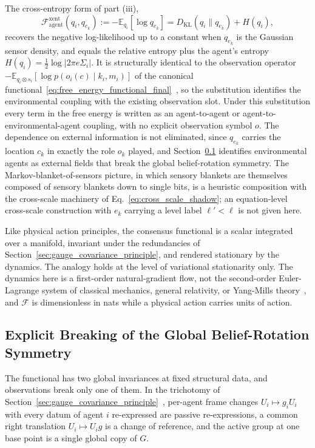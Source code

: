 The cross-entropy form of part (iii),
\begin{equation}
\mathcal{F}_{\text{agent}}^{\mathrm{xent}}(q_i, q_{e_k}) := -\mathbb{E}_{q_i}[\log q_{e_k}] = D_{\mathrm{KL}}(q_i \| q_{e_k}) + H(q_i),
\label{eq:xent_resolution}
\end{equation}
recovers the negative log-likelihood up to a constant when $q_{e_k}$ is the Gaussian sensor density, and equals the relative entropy plus the agent's entropy $H(q_i) = \tfrac{1}{2}\log|2\pi e \Sigma_i|$. It is structurally identical to the observation operator $-\mathbb{E}_{q_i\otimes s_i}[\log p(o_i(c)\mid k_i, m_i)]$ of the canonical functional~\eqref{eq:free_energy_functional_final}~\cite{Friston2010, parr2022active}, so the substitution identifies the environmental coupling with the existing observation slot. Under this substitution every term in the free energy is written as an agent-to-agent or agent-to-environmental-agent coupling, with no explicit observation symbol $o$. The dependence on external information is not eliminated, since $q_{e_k}$ carries the location $c_k$ in exactly the role $o_k$ played, and Section~\ref{sec:symmetry_breaking} identifies environmental agents as external fields that break the global belief-rotation symmetry. The Markov-blanket-of-sensors picture, in which sensory blankets are themselves composed of sensory blankets down to single bits, is a heuristic composition with the cross-scale machinery of Eq.~\eqref{eq:cross_scale_shadow}; an equation-level cross-scale construction with $e_k$ carrying a level label $\ell' < \ell$ is not given here.

Like physical action principles, the consensus functional is a scalar integrated over a manifold, invariant under the redundancies of Section~\ref{sec:gauge_covariance_principle}, and rendered stationary by the dynamics. The analogy holds at the level of variational stationarity only. The dynamics here is a first-order natural-gradient flow, not the second-order Euler-Lagrange system of classical mechanics, general relativity, or Yang-Mills theory~\cite{Yang1954}, and $\mathcal{F}$ is dimensionless in nats while a physical action carries units of action.

\subsection{Explicit Breaking of the Global Belief-Rotation Symmetry}
\label{sec:symmetry_breaking}

The functional has two global invariances at fixed structural data, and observations break only one of them. In the trichotomy of Section~\ref{sec:gauge_covariance_principle}~\cite[Ch.~2]{DennisGaugeVFE2026}, per-agent frame changes $U_i \mapsto g_i U_i$ with every datum of agent $i$ re-expressed are passive re-expressions, a common right translation $U_i \mapsto U_i g$ is a change of reference, and the active group at one base point is a single global copy of $G$.

